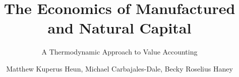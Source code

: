 \documentclass[graybox,envcountchap,sectrefs]{svmono}
\begin{document}
\author{Matthew Kuperus Heun, Michael Carbajales-Dale, Becky Roselius Haney}
\title{The Economics of Manufactured and Natural Capital}
\subtitle{A Thermodynamic Approach to Value Accounting}
\maketitle{}

\glsaddall[types={nomenclature,glossary}]

\frontmatter%

%
%
%
%


\tableofcontents{}
\listoffigures{}
\listoftables{}


\printglossary[type=nomenclature, style=nomenclaturestyle, nonumberlist=true]

\setcounter{chapter}{-3}

{
	\renewcommand{\chaptermark}[1]{ \markboth{#1}{} }

	

	

	 

	
}


\mainmatter%
\end{document}
